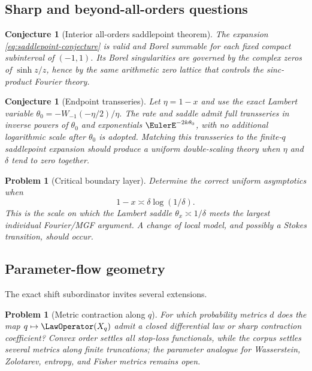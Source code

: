 \documentclass[11pt,a4paper]{article}
\newtheorem{conjecture}[theorem]{Conjecture}
\newtheorem{problem}[theorem]{Problem}
\theoremstyle{definition}
\begin{document}
\subsection{Sharp and beyond-all-orders questions}

\begin{conjecture}[Interior all-orders saddlepoint theorem]
The expansion \eqref{eq:saddlepoint-conjecture} is valid and Borel summable
for each fixed compact subinterval of $(-1,1)$.  Its Borel singularities are
governed by the complex zeros of $\sinh z/z$, hence by the same arithmetic
zero lattice that controls the sinc-product Fourier theory.
\end{conjecture}

\begin{conjecture}[Endpoint transseries]
Let $\eta=1-x$ and use the exact Lambert variable
$\theta_0=-W_{-1}(-\eta/2)/\eta$.  The rate and saddle admit full transseries
in inverse powers of $\theta_0$ and exponentials $\EulerE^{-2k\theta_0}$, with no
additional logarithmic scale after $\theta_0$ is adopted.  Matching this
transseries to the finite-$q$ saddlepoint expansion should produce a uniform
double-scaling theory when $\eta$ and $\delta$ tend to zero together.
\end{conjecture}

\begin{problem}[Critical boundary layer]
Determine the correct uniform asymptotics when
\[
 1-x\asymp \delta\log(1/\delta).
\]
This is the scale on which the Lambert saddle
$\theta_x\asymp1/\delta$ meets the largest individual Fourier/MGF argument.
A change of local model, and possibly a Stokes transition, should occur.
\end{problem}

\subsection{Parameter-flow geometry}

The exact shift subordinator invites several extensions.

\begin{problem}[Metric contraction along $q$]
For which probability metrics $d$ does the map $q\mapsto\LawOperator(X_q)$ admit a
closed differential law or sharp contraction coefficient?  Convex order
settles all stop-loss functionals, while the corpus settles several metrics
along finite truncations; the parameter analogue for Wasserstein,
Zolotarev, entropy, and Fisher metrics remains open.
\end{problem}
\end{document}
